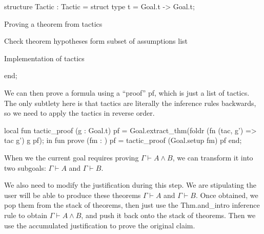 \nwenddocs{}\endmoddef\nwstartdeflinemarkup\nwenddeflinemarkup
structure Tactic : Tactic = struct
type t = Goal.t -> Goal.t;

\LA{}Proving a theorem from tactics~{\nwtagstyle{}}\RA{}

\LA{}Check theorem hypotheses form subset of assumptions list~{\nwtagstyle{}}\RA{}

\LA{}Implementation of tactics~{\nwtagstyle{}}\RA{}

end;
\nwendcode{}\nwdocspar

\begin{node}
We can then prove a formula using a ``proof'' {\Tt{}pf\nwendquote}, which is just a
list of tactics. The only subtlety here is that tactics are literally
the inference rules backwards, so we need to apply the tactics in
reverse order.
\end{node}

\nwenddocs{}\endmoddef\nwstartdeflinemarkup{}\nwenddeflinemarkup
local
  fun tactic_proof (g : Goal.t) pf =
    Goal.extract_thm(foldr (fn (tac, g') => tac g')
                           g
                           pf);
in
fun prove (fm : ) pf =
  tactic_proof (Goal.setup fm) pf
end;
\eatline
{}\nwendcode{}\nwdocspar
\begin{node}
When we the current goal requires proving $\Gamma\vdash A\land B$,
we can transform it into two subgoals: $\Gamma\vdash A$ and
$\Gamma\vdash B$.

We also need to modify the justification during this step. We are
stipulating the user will be able to produce these theorems
$\Gamma\vdash A$ and $\Gamma\vdash B$. Once obtained, we pop them from
the stack of theorems, then just use the
{\Tt{}Thm.and{\_}intro\nwendquote} inference rule to obtain $\Gamma\vdash A\land B$,
and push it back onto the stack of theorems. Then we use the
accumulated justification to prove the original claim.
\end{node}

